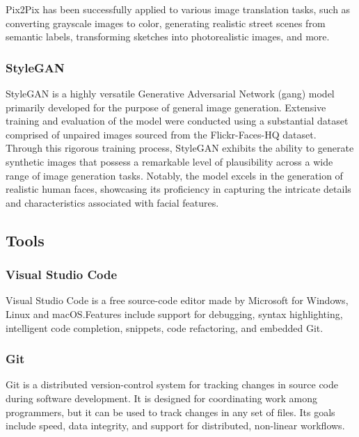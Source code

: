 Pix2Pix has been successfully applied to various image translation tasks, such as converting grayscale images to color, generating realistic street scenes from semantic labels, transforming sketches into photorealistic images, and more.

\subsubsection{StyleGAN}\label{subsubsec:stylegan}
StyleGAN is a highly versatile Generative Adversarial Network (\gls{gang}) model primarily developed for the purpose of general image generation. 
Extensive training and evaluation of the model were conducted using a substantial dataset comprised of unpaired images sourced from the Flickr-Faces-HQ dataset. Through this rigorous training process, StyleGAN exhibits the ability to generate synthetic images that possess a remarkable level of plausibility across a wide range of image generation tasks. 
Notably, the model excels in the generation of realistic human faces, showcasing its proficiency in capturing the intricate details and characteristics associated with facial features.

\subsection{Tools}\label{subsec:tools}
\subsubsection*{Visual Studio Code}\label{subsubsec:vscode}
Visual Studio Code is a free source-code editor made by Microsoft for Windows,
Linux and macOS.\@ Features include support for debugging, syntax highlighting,
intelligent code completion, snippets, code refactoring, and embedded Git.
\subsubsection{Git}\label{subsubsec:git}
Git is a distributed version-control system for tracking changes in source code
during software development. It is designed for coordinating work among
programmers, but it can be used to track changes in any set of files. Its goals
include speed, data integrity, and support for distributed, non-linear
workflows.
